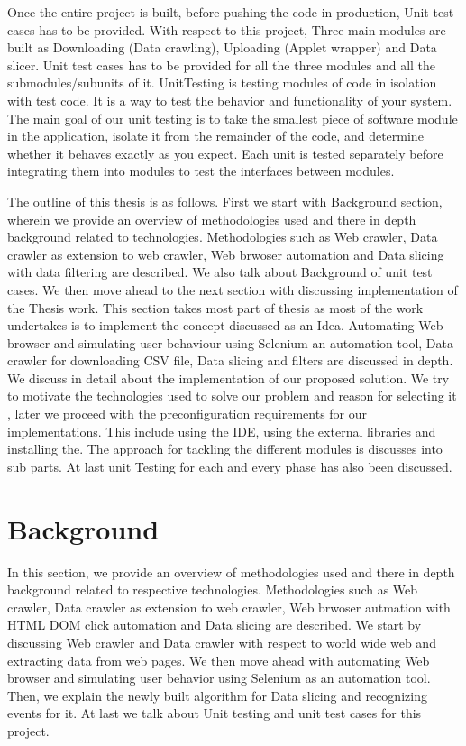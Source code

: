 \documentclass[article,type=msc,colorback,accentcolor=tud9c,twoside,11pt]{tudthesis}
\begin{document}
Once the entire project is built, before pushing the code in production, Unit test cases has to be provided. With respect to this project, Three main modules are built as Downloading (Data crawling), Uploading (Applet wrapper) and Data slicer. Unit test cases has to be provided for all the three modules and all the submodules/subunits of it. UnitTesting\cite{EffectivnessofUnitTest} is testing modules of code in isolation with test code. It is a way to test the behavior and functionality of your system. The main goal of our unit testing is to take the smallest piece of software module in the application, isolate it from the remainder of the code, and determine whether it behaves exactly as you expect. Each unit is tested separately before integrating them into modules to test the interfaces between modules.


The outline of this thesis is as follows. First we start with Background section, wherein we provide an overview of methodologies used and there in depth background related to technologies. Methodologies such as Web crawler, Data crawler as extension to web crawler, Web brwoser automation and Data slicing with data filtering are described. We also talk about Background of unit test cases. We then move ahead to the next section with discussing implementation of the Thesis work. This section takes most part of thesis as most of the work undertakes is to implement the concept discussed as an Idea. Automating Web browser and simulating user behaviour using Selenium an automation tool, Data crawler for downloading CSV file, Data slicing and filters are discussed in depth. We discuss in detail about the implementation of our proposed solution. We try to motivate the technologies used to solve our problem and reason for selecting it , later we proceed with the preconfiguration requirements for our implementations. This include using the IDE, using the external libraries and installing the. The approach for tackling the different modules is discusses into sub parts. At last unit Testing for each and every phase has also been discussed.

\clearpage
\section{Background}
In this section, we provide an overview of methodologies used and there in depth background related to respective technologies. Methodologies such as Web crawler, Data crawler as extension to web crawler, Web brwoser autmation with HTML DOM click automation and Data slicing are described. We start by discussing Web crawler and Data crawler with respect to world wide web and extracting data from web pages. We then move ahead with automating Web browser and simulating user behavior using Selenium as an automation tool. Then, we explain the newly built algorithm for Data slicing and recognizing events for it. At last we talk about Unit testing and unit test cases for this project.
\end{document}

